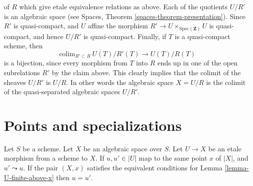 \begin{remark}
of $R$ which give etale equivalence relations as above. Each of the
quotients $U/R'$ is an algebraic space
(see Spaces, Theorem \ref{spaces-theorem-presentation}).
Since $R'$ is quasi-compact, and $U$ affine the morphism
$R' \to U \times_{\text{Spec}(\mathbf{Z})} U$ is quasi-compact,
and hence $U/R'$ is quasi-compact. Finally, if $T$ is a quasi-compact
scheme, then
$$
\text{colim}_{R' \subset R}\ U(T)/R'(T) \longrightarrow U(T)/R(T)
$$
is a bijection, since every morphism from $T$ into $R$ ends up in one
of the open subrelations $R'$ by the claim above. This clearly implies
that the colimit of the sheaves $U/R'$ is $U/R$. In other words
the algebraic space $X = U/R$ is the colimit of the quasi-separated
algebraic spaces $U/R'$.
\end{remark}





\section{Points and specializations}
\label{section-specializations}

\begin{lemma}
\label{lemma-no-specializations-map-to-same-point}
Let $S$ be a scheme.
Let $X$ be an algebraic space over $S$.
Let $U \to X$ be an etale morphism from a scheme to $X$.
If $u, u' \in |U|$ map to the same point $x$ of $|X|$, and
$u' \leadsto u$. If the pair $(X, x)$ satisfies the
equivalent conditions for Lemma \ref{lemma-U-finite-above-x}
then $u = u'$.
\end{lemma}

